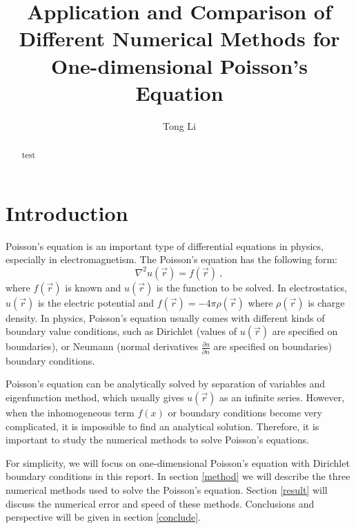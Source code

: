 \documentclass{article}
\title{Application and Comparison of Different Numerical Methods for One-dimensional Poisson's Equation}
\author[1]{Tong Li}
\affil[1]{Department of Physics \& Astronomy, Michigan State University}
\date{}
\begin{document}
	\maketitle
	\begin{abstract}
		test
	\end{abstract}

	\section{Introduction}
	Poisson's equation is an important type of differential equations in physics, 
	especially in electromagnetism. 
	The Poisson's equation has the following form: 
	\begin{equation}
	\nabla^{2} u\left( \vec{r}\right)  = f\left( \vec{r} \right) \ ,
	\end{equation}
	where $f\left( \vec{r}\right)$ is known and 
	$u\left( \vec{r}\right)$ is the function to be solved. 
	In electrostatics, $u\left( \vec{r}\right)$ is the electric potential and 
	$f\left( \vec{r}\right)=-4\pi \rho\left( \vec{r} \right)$ 
	where $\rho\left( \vec{r} \right) $ is charge density. 
	In physics, Poisson's equation usually comes with different kinds of boundary value conditions, 
	such as Dirichlet (values of $u\left( \vec{r}\right)$ are specified on boundaries), 
	or Neumann (normal derivatives $\frac{\partial u}{\partial n}$ are specified on boundaries) 
	boundary conditions. 
	\par
	Poisson's equation can be analytically solved by separation of variables and eigenfunction method, 
	which usually gives $u\left( \vec{r}\right)$ as an infinite series. 
	However, when the inhomogeneous term $f(x)$ or boundary conditions become very complicated, 
	it is impossible to find an analytical solution. 
	Therefore, it is important to study the numerical methods to solve Poisson's equations. 
	\par
	For simplicity, we will focus on one-dimensional Poisson's equation 
	with Dirichlet boundary conditions in this report. 
    In section \ref{method} we will describe the three numerical methods 
    used to solve the Poisson's equation. 
    Section \ref{result} will discuss the numerical error and speed of these methods. 
    Conclusions and perspective will be given in section \ref{conclude}. 
	
\end{document}
